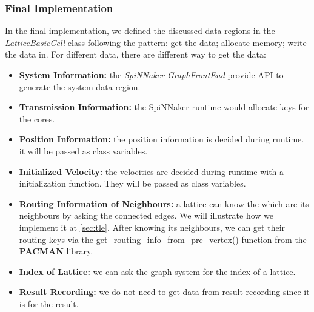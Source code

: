 \subsubsection{Final Implementation}
In the final implementation, we defined the discussed data regions in the \textit{LatticeBasicCell} class following the pattern: get the data; allocate memory; write the data in. For different data, there are different way to get the data:

\begin{itemize}
    \item \textbf{System Information:} the \textit{SpiNNaker GraphFrontEnd} provide API to generate the system data region.
    \item \textbf{Transmission Information:} the SpiNNaker runtime would allocate keys for the cores.
    \item \textbf{Position Information:} the position information is decided during runtime. it will be passed as class variables.
    \item \textbf{Initialized Velocity:} the velocities are decided during runtime with a initialization function. They will be passed as class variables. 
    \item \textbf{Routing Information of Neighbours:} a lattice can know the which are its neighbours by asking the connected edges. We will illustrate how we implement it at \ref{sec:tle}. After knowing its neighbours, we can get their routing keys via the get\_routing\_info\_from\_pre\_vertex() function from the \textbf{PACMAN} library.
    \item \textbf{Index of Lattice:} we can ask the graph system for the index of a lattice.
    \item \textbf{Result Recording:} we do not need to get data from result recording since it is for the result.
\end{itemize}

